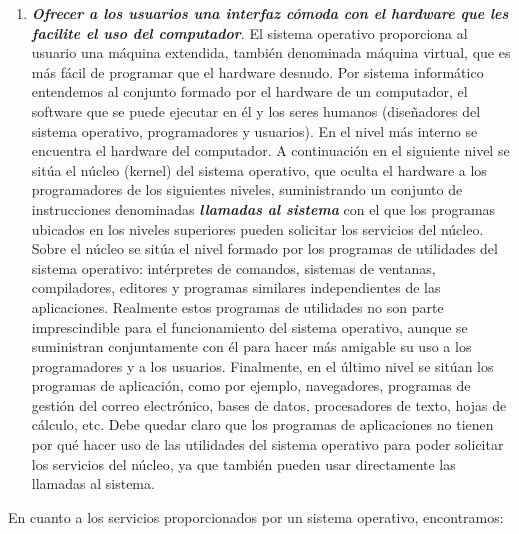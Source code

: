 \documentclass[12pt]{article}
\begin{document}
\begin{enumerate}
\item \textbf{\textit{Ofrecer a los usuarios una interfaz cómoda con el hardware que les facilite el uso del computador}}. El sistema operativo proporciona al usuario una máquina extendida, también denominada máquina virtual, que es más fácil de programar que el hardware desnudo. Por sistema informático entendemos al conjunto formado por el hardware de un computador, el software que se puede ejecutar en él y los seres humanos (diseñadores del sistema operativo, programadores y usuarios). En el nivel más interno se encuentra el hardware del computador. A continuación en el siguiente nivel se sitúa el núcleo (kernel) del sistema operativo, que oculta el hardware a los programadores de los siguientes niveles, suministrando un conjunto de instrucciones denominadas \textbf{\textit{llamadas al sistema}} con el que los programas ubicados en los niveles superiores pueden solicitar los servicios del núcleo. Sobre el núcleo se sitúa el nivel formado por los programas de utilidades del sistema operativo: intérpretes de comandos, sistemas de ventanas, compiladores, editores y programas similares independientes de las aplicaciones. Realmente estos programas de utilidades no son parte imprescindible para el funcionamiento del sistema operativo, aunque se suministran conjuntamente con él para hacer más amigable su uso a los programadores y a los usuarios. Finalmente, en el último nivel se sitúan los programas de aplicación, como por ejemplo, navegadores, programas de gestión del
correo electrónico, bases de datos, procesadores de texto, hojas de cálculo, etc. Debe quedar claro que los programas de aplicaciones no tienen por qué hacer uso de las utilidades del sistema operativo para poder solicitar los servicios del núcleo, ya que también pueden usar directamente las llamadas al sistema.
\end{enumerate}

En cuanto a los servicios proporcionados por un sistema operativo, encontramos:
\end{document}
